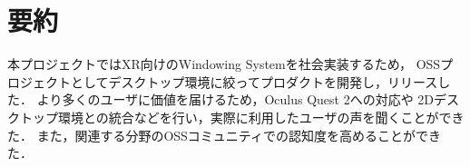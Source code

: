 \section{要約}

本プロジェクトではXR向けのWindowing Systemを社会実装するため，
OSSプロジェクトとしてデスクトップ環境に絞ってプロダクトを開発し，リリースした．
より多くのユーザに価値を届けるため，Oculus Quest 2への対応や
2Dデスクトップ環境との統合などを行い，実際に利用したユーザの声を聞くことができた．
また，関連する分野のOSSコミュニティでの認知度を高めることができた．
